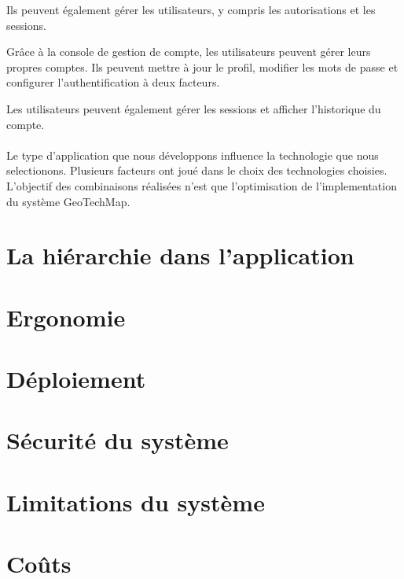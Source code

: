         Ils peuvent également gérer les utilisateurs, y compris les autorisations et les sessions.   
        \par 
        Grâce à la console de gestion de compte, les utilisateurs peuvent gérer leurs propres comptes. Ils peuvent mettre à jour le profil, modifier les mots de passe et configurer l'authentification à deux facteurs.

        Les utilisateurs peuvent également gérer les sessions et afficher l'historique du compte.   
        \paragraph{}
        Le type d'application que nous développons influence la technologie que nous selectionons.
        Plusieurs facteurs ont joué dans le choix des technologies choisies. L'objectif des combinaisons
        réalisées n'est que l'optimisation de l'implementation du système GeoTechMap.
        \section{La hiérarchie dans l'application}
        \lipsum[1]
        \section{Ergonomie}
        \lipsum[1]
        \section{Déploiement}
        \lipsum[1]
        \section{Sécurité du système}
        \lipsum[1]
        \section{Limitations du système}
        \lipsum[1]
        \section{Coûts}
        \lipsum[1]
    
